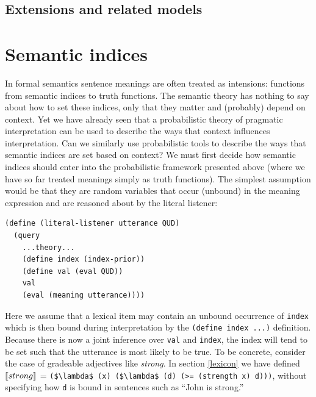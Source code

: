 \documentclass[12pt]{article}
\newcommand{\llbracket}{\ensuremath{\left [\!\left [}}%
\newcommand{\rrbracket}{\ensuremath{\right ]\!\right ]}}
\providecommand{\sv}[1]{\ensuremath{\llbracket #1 \rrbracket}}
\begin{document}
\subsection{Extensions and related models}




\section{Semantic indices}
\label{indices}

In formal semantics \cite{montague} sentence meanings are often treated as intensions: functions from semantic indices to truth functions. The semantic theory has nothing to say about how to set these indices, only that they matter and (probably) depend on context. Yet we have already seen that a probabilistic theory of pragmatic interpretation can be used to describe the ways that context influences interpretation. Can we similarly use probabilistic tools to describe the ways that semantic indices are set based on context?
We must first decide how semantic indices should enter into the probabilistic framework presented above (where we have so far treated meanings simply as truth functions). The simplest assumption would be that they are random variables that occur (unbound) in the meaning expression and are reasoned about by the literal listener:
\begin{lstlisting}
(define (literal-listener utterance QUD)
  (query
    ...theory...
    (define index (index-prior))
    (define val (eval QUD))
    val
    (eval (meaning utterance))))
\end{lstlisting}
Here we assume that a lexical item may contain an unbound occurrence of \lstinline{index} which is then bound during interpretation by  the \lstinline{(define index ...)} definition.
Because there is now a joint inference over \lstinline{val} and \lstinline{index}, the index will tend to be set such that the utterance is most likely to be true. 
To be concrete, consider the case of gradeable adjectives like \emph{strong}. In section \ref{lexicon} we have defined \sv{strong} = \lstinline[mathescape]{($\lambda$ (x) ($\lambda$ (d) (>= (strength x) d)))}, without specifying how \lstinline{d} is bound in sentences such as ``John is strong.'' 
\end{document}
